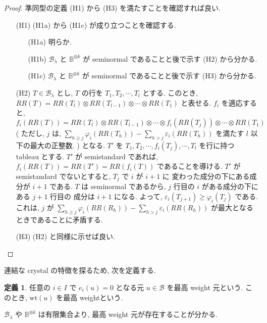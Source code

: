 \documentclass[
  a4paper, 
  12pt,
  ja=standard,
  xelatex,
  left=30truemm,
  right=30truemm,
  titlepage 
]{bxjsarticle}
\theoremstyle{definition}
\newtheorem{df}{定義}[section]
\begin{document}
\begin{proof}
  準同型の定義 (H1) から (H3) を満たすことを確認すれば良い.
  \begin{enumerate}
    \item[(H1)] (H1a) から (H1c) が成り立つことを確認する.
    \begin{enumerate}
      \item[(H1a)] 明らか. 
      \item[(H1b)] $\mathcal{B}_{\lambda}$ と $\mathbb{B}^{ \otimes k}$ が seminormal であることと後で示す (H2) から分かる.
      \item[(H1c)] $\mathcal{B}_{\lambda}$ と $\mathbb{B}^{ \otimes k}$ が seminormal であることと後で示す (H3) から分かる.
    \end{enumerate}
    \item[(H2)] $T \in \mathcal{B}_{\lambda}$ とし, $T$ の行を $T_1, T_2, \cdots, T_l$ とする.
    このとき, $RR(T) = RR(T_l) \otimes RR(T_{l-1}) \otimes \cdots \otimes RR(T_1)$ と表せる. $f_i$ を適応すると, 
    $$f_i(RR(T)) = RR(T_l) \otimes RR(T_{l-1}) \otimes \cdots \otimes f_i(RR(T_j)) \otimes \cdots \otimes RR(T_1)$$
    ( ただし, $j$ は, $\sum_{h \geq j } \varphi_i(RR(T_h)) - \sum_{ h > j } \varepsilon_i (RR(T_h))$ を満たす $l$ 以下の最大の正整数. )
    となる. $T'$ を $T_1, T_2, \cdots, f_i(T_j), \cdots, T_l$ を行に持つ tableau とする. $T'$ が semistandard であれば,
    $f_i(RR(T)) = RR(T') = RR(f_i(T))$ であることを導ける. $T'$ が semistandard でないとすると, $T_j$ で $i$ が $i + 1$ に
    変わった成分の下にある成分が $i + 1$ である. $T$ は seminormal であるから, $j$ 行目の $i$ がある成分の下にある $j + 1$ 行目の
    成分は $i + 1$ になる. よって, $\varepsilon_i(T_{j + 1}) \geq \varphi_i(T_j)$ である.
    これは, $j$ が $\sum_{h \geq j } \varphi_i(RR(R_h)) - \sum_{ h > j } \varepsilon_i (RR(R_h))$
    が最大となるときであることに矛盾する.
    \item[(H3)] (H2) と同様に示せば良い.
  \end{enumerate}
\end{proof}

連結な crystal の特徴を探るため, 次を定義する.

\begin{df}
  任意の $i \in I$ で $e_i(u) = 0$ となる元 $u \in \mathcal{B}$ を最高 weight 元という. このとき, $\mathrm{wt}(u)$ を最高 weightという.
\end{df}

$\mathcal{B}_{\lambda}$ や $\mathbb{B}^{\otimes k}$ は有限集合より, 最高 weight 元が存在することが分かる.
\end{document}
